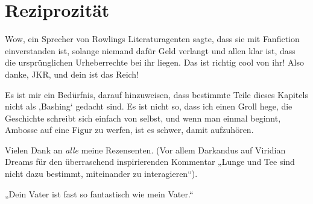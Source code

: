 \chapter{Reziprozität}

\begin{chapterOpeningAuthorNote}
Wow, ein Sprecher von Rowlings Literaturagenten sagte, dass sie mit Fanfiction einverstanden ist, solange niemand dafür Geld verlangt und allen klar ist, dass die ursprünglichen Urheberrechte bei ihr liegen. Das ist richtig cool von ihr! Also danke, JKR, und dein ist das Reich!

Es ist mir ein Bedürfnis, darauf hinzuweisen, dass bestimmte Teile dieses Kapitels nicht als ‚Bashing‘ gedacht sind. Es ist nicht so, dass ich einen Groll hege, die Geschichte schreibt sich einfach von selbst, und wenn man einmal beginnt, Ambosse auf eine Figur zu werfen, ist es schwer, damit aufzuhören.


Vielen Dank an \emph{alle} meine Rezensenten. (Vor allem Darkandus auf Viridian Dreams für den überraschend inspirierenden Kommentar
„Lunge und Tee sind nicht dazu bestimmt, miteinander zu interagieren“).
\end{chapterOpeningAuthorNote}
\begin{chapterOpeningQuote}
„Dein Vater ist fast so fantastisch wie mein Vater.“
\end{chapterOpeningQuote}

